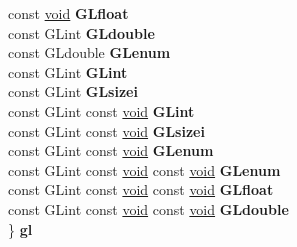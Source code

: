 \begin{DoxyCompactItemize}
\begin{tabbing}
\>const \hyperlink{interfacevoid}{void} {\bfseries GLfloat}\\
\>const GLint {\bfseries GLdouble}\\
\>const GLdouble {\bfseries GLenum}\\
\>const GLint {\bfseries GLint}\\
\>const GLint {\bfseries GLsizei}\\
\>const GLint const \hyperlink{interfacevoid}{void} {\bfseries GLint}\\
\>const GLint const \hyperlink{interfacevoid}{void} {\bfseries GLsizei}\\
\>const GLint const \hyperlink{interfacevoid}{void} {\bfseries GLenum}\\
\>const GLint const \hyperlink{interfacevoid}{void} const \hyperlink{interfacevoid}{void} {\bfseries GLenum}\\
\>const GLint const \hyperlink{interfacevoid}{void} const \hyperlink{interfacevoid}{void} {\bfseries GLfloat}\\
\>const GLint const \hyperlink{interfacevoid}{void} const \hyperlink{interfacevoid}{void} {\bfseries GLdouble}\\
\} {\bfseries gl}\\


\end{tabbing}
\end{DoxyCompactItemize}
